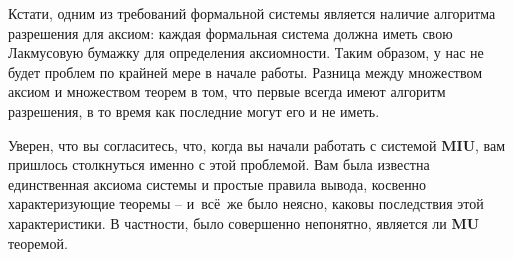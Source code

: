 \documentclass[../main.tex]{subfiles}
\begin{document}
Кстати, одним из требований формальной системы является наличие алгоритма разрешения для аксиом: каждая формальная система должна иметь свою Лакмусовую бумажку для определения аксиомности. Таким образом, у нас не будет проблем по крайней мере в начале работы. Разница между множеством аксиом и множеством теорем в том, что первые всегда имеют алгоритм разрешения, в то время как последние могут его и не иметь.

Уверен, что вы согласитесь, что, когда вы начали работать с системой \textbf{MIU}, вам пришлось столкнуться именно с этой проблемой. Вам была известна единственная аксиома системы и простые правила вывода, косвенно характеризующие теоремы \--- и~всё~же было неясно, каковы последствия этой характеристики. В частности, было совершенно непонятно, является ли \textbf{MU} теоремой.

\end{document}
